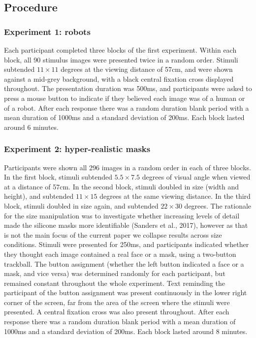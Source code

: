 \documentclass[
]{article}
\begin{document}
\hypertarget{procedure}{%
\subsection{Procedure}\label{procedure}}

\hypertarget{experiment-1-robots}{%
\subsubsection{Experiment 1: robots}\label{experiment-1-robots}}

Each participant completed three blocks of the first experiment. Within each block, all 90 stimulus images were presented twice in a random order. Stimuli subtended \(11\times11\) degrees at the viewing distance of 57cm, and were shown against a mid-grey background, with a black central fixation cross displayed throughout. The presentation duration was 500ms, and participants were asked to press a mouse button to indicate if they believed each image was of a human or of a robot. After each response there was a random duration blank period with a mean duration of 1000ms and a standard deviation of 200ms. Each block lasted around 6 minutes.

\hypertarget{experiment-2-hyper-realistic-masks}{%
\subsubsection{Experiment 2: hyper-realistic masks}\label{experiment-2-hyper-realistic-masks}}

Participants were shown all 296 images in a random order in each of three blocks. In the first block, stimuli subtended \(5.5\times7.5\) degrees of visual angle when viewed at a distance of 57cm. In the second block, stimuli doubled in size (width and height), and subtended \(11\times15\) degrees at the same viewing distance. In the third block, stimuli doubled in size again, and subtended \(22\times30\) degrees. The rationale for the size manipulation was to investigate whether increasing levels of detail made the silicone masks more identifiable (Sanders et al., 2017), however as that is not the main focus of the current paper we collapse results across size conditions. Stimuli were presented for 250ms, and participants indicated whether they thought each image contained a real face or a mask, using a two-button trackball. The button assignment (whether the left button indicated a face or a mask, and vice versa) was determined randomly for each participant, but remained constant throughout the whole experiment. Text reminding the participant of the button assignment was present continuously in the lower right corner of the screen, far from the area of the screen where the stimuli were presented. A central fixation cross was also present throughout. After each response there was a random duration blank period with a mean duration of 1000ms and a standard deviation of 200ms. Each block lasted around 8 minutes.
\end{document}
